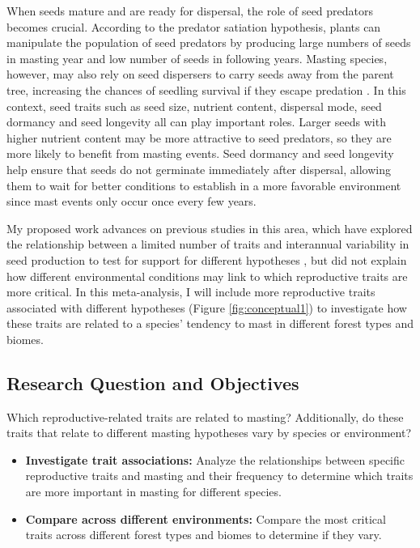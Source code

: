 \documentclass[11pt,letter]{article}
\begin{document}
When seeds mature and are ready for dispersal, the role of seed predators becomes crucial. According to the predator satiation hypothesis, plants can manipulate the population of seed predators by producing large numbers of seeds in masting year and low number of seeds in following years. Masting species, however, may also rely on seed dispersers to carry seeds away from the parent tree, increasing the chances of seedling survival if they escape predation \citep{janzen1971seed, silvertown1980evolutionary}. In this context, seed traits such as seed size, nutrient content, dispersal mode, seed dormancy and seed longevity all can play important roles. Larger seeds with higher nutrient content may be more attractive to seed predators, so they are more likely to benefit from masting events. Seed dormancy and seed longevity help ensure that seeds do not germinate immediately after dispersal, allowing them to wait for better conditions to establish in a more favorable environment since mast events only occur once every few years.

My proposed work advances on previous studies in this area, which have explored the relationship between a limited number of traits and interannual variability in seed production to test for support for different hypotheses \citep{fernandez2019nutrient, journe2023evolution, pearse2020biogeography}, but did not explain how different environmental conditions may link to which reproductive traits are more critical. In this meta-analysis, I will include more reproductive traits associated with different hypotheses (Figure \ref{fig:conceptual1}) to investigate how these traits are related to a species' tendency to mast in different forest types and biomes.

\subsection{Research Question and Objectives}
Which reproductive-related traits are related to masting? Additionally, do these traits that relate to different masting hypotheses vary by species or environment?
	\begin{itemize}
	\item \textbf{Investigate trait associations:} Analyze the relationships between specific reproductive traits and masting and their frequency to determine which traits are more important in masting for different species.
	\item \textbf{Compare across different environments:} Compare the most critical traits across different forest types and biomes to determine if they vary.
	\end{itemize}
\end{document}
